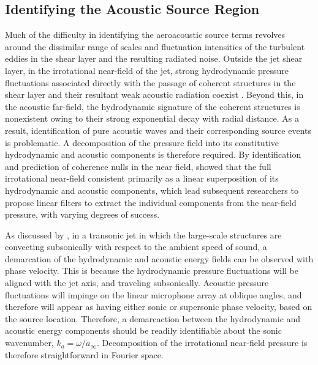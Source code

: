 \subsection{Identifying the Acoustic Source Region}
\label{sect:near_field_source_region}
Much of the difficulty in identifying the aeroacoustic source terms revolves around the dissimilar range of scales and fluctuation intensities of the turbulent eddies in the shear layer and the resulting radiated noise. 
Outside the jet shear layer, in the irrotational near-field of the jet, strong hydrodynamic pressure fluctuations associated directly with the passage of coherent structures in the shear layer and their resultant weak acoustic radiation coexist \citep{Arndt1997}. 
Beyond this, in the acoustic far-field, the hydrodynamic signature of the coherent structures is nonexistent owing to their strong exponential decay with radial distance.
As a result, identification of pure acoustic waves and their corresponding source events is problematic.
A decomposition of the pressure field into its constitutive hydrodynamic and acoustic components is therefore required. 
By identification and prediction of coherence nulls in the near field, \citet{Coiffet2006} showed that the full irrotational near-field consistent primarily as a linear superposition of its hydrodynamic and acoustic components, which lead subsequent researchers to propose linear filters to extract the individual components from the near-field pressure, with varying degrees of success. 

As discussed by \citet{Tinney2008}, in a transonic jet in which the large-scale structures are convecting subsonically with respect to the ambient speed of sound, a demarcation of the hydrodynamic and acoustic energy fields can be observed with phase velocity.
This is because the hydrodynamic pressure fluctuations will be aligned with the jet axis, and traveling subsonically. 
Acoustic pressure fluctuations will impinge on the linear microphone array at oblique angles, and therefore will appear as having either sonic or supersonic phase velocity, based on the source location. 
Therefore, a demarcaction between the hydrodynamic and acoustic energy components should be readily identifiable about the sonic wavenumber, $k_a = \omega / a_\infty$.
Decomposition of the irrotational near-field pressure is therefore straightforward in Fourier space.

